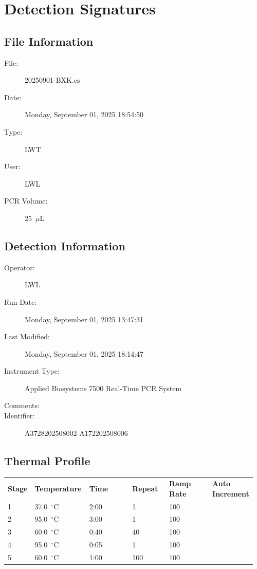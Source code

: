 \documentclass[UTF8,10pt,a4paper,fontset=fandol]{ctexart}
\begin{document}
\newpage

\section*{Detection Signatures}

\subsection*{File Information}

\begin{description}
  \item[File:] 20250901-BXK.cs
  \item[Date:] Monday, September 01, 2025 18:54:50
  \item[Type:] LWT
  \item[User:] LWL
  \item[PCR Volume:] 25~$\mu$L
\end{description}

\subsection*{Detection Information}

\begin{description}
  \item[Operator:] LWL
  \item[Run Date:] Monday, September 01, 2025 13:47:31
  \item[Last Modified:] Monday, September 01, 2025 18:14:47
  \item[Instrument Type:] Applied Biosystems 7500 Real-Time PCR System
  \item[Comments:] \mbox{}
  \item[Identifier:] A3728202508002-A172202508006
\end{description}

\subsection*{Thermal Profile}

\begin{center}
\begin{tabular}{p{0.08\linewidth}p{0.22\linewidth}p{0.18\linewidth}p{0.15\linewidth}p{0.18\linewidth}p{0.15\linewidth}}
\textbf{Stage} & \textbf{Temperature} & \textbf{Time} & \textbf{Repeat} & \textbf{Ramp Rate} & \textbf{Auto Increment} \\
1 & 37.0~$^\circ$C & 2:00 & 1 & 100 & \\
2 & 95.0~$^\circ$C & 3:00 & 1 & 100 & \\
3 & 60.0~$^\circ$C & 0:40 & 40 & 100 & \\
4 & 95.0~$^\circ$C & 0:05 & 1 & 100 & \\
5 & 60.0~$^\circ$C & 1:00 & 100 & 100 &
\end{tabular}
\end{center}
\end{document}
